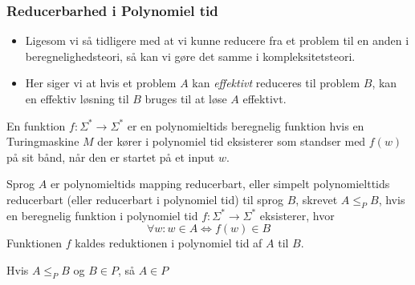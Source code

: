 \begin{frame}[allowframebreaks]
	\frametitle{Reducerbarhed i Polynomiel tid}
	\begin{itemize}
		\item Ligesom vi så tidligere med at vi kunne reducere fra et problem til en anden i beregnelighedsteori, så kan vi gøre det samme i kompleksitetsteori.
		\item Her siger vi at hvis et problem $A$ kan \textit{effektivt} reduceres til problem $B$, kan en effektiv løsning til $B$ bruges til at løse $A$ effektivt.
	\end{itemize}

	\begin{definition}
		En funktion $f : \Sigma^{*} \longrightarrow \Sigma^{*}$ er en polynomieltids beregnelig funktion  hvis en Turingmaskine $M$ der kører i polynomiel tid eksisterer som standser med $f(w)$ på sit bånd, når den er startet på et input $w$.
	\end{definition}

	\begin{definition}
		Sprog $A$ er polynomieltids mapping reducerbart, eller simpelt polynomielttids reducerbart (eller reducerbart i polynomiel tid) til sprog $B$, skrevet $A \le_{P} B$, hvis en beregnelig funktion i polynomiel tid $f : \Sigma^{*} \longrightarrow \Sigma^{*}$ eksisterer, hvor
		\begin{equation*}
			\forall w : w \in A \iff f(w) \in B
		\end{equation*}
		Funktionen $f$ kaldes reduktionen i polynomiel tid af $A$ til $B$.
	\end{definition}

	\begin{theorem}
		Hvis $A \le_{P} B$ og $B \in P$, så $A \in P$
	\end{theorem}


\end{frame}
